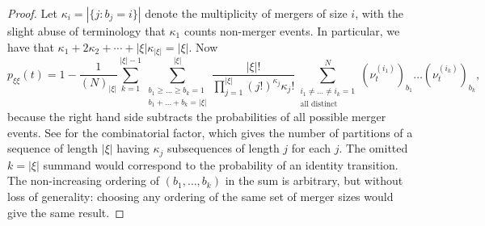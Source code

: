 \documentclass{article}
\theoremstyle{definition}
\newcommand{\1}[1]{\mathbbm{1}_{\{#1\}}}
\begin{document}
\begin{proof}
Let $\kappa_i = |\{ j : b_j = i \}|$ denote the multiplicity of mergers of size $i$, with the slight abuse of terminology that $\kappa_1$ counts non-merger events.
In particular, we have that $\kappa_1 + 2 \kappa_2 + \cdots + | \xi | \kappa_{ | \xi | } = | \xi |$.
Now
\begin{equation*}
p_{ \xi \xi }( t ) = 1 - \frac{ 1 }{ ( N )_{ | \xi | } } \sum_{ k = 1 }^{ | \xi | - 1 } \sum_{ \substack{ b_1 \geq \ldots \geq b_k = 1 \\ b_1 + \ldots + b_k = | \xi | } }^{ | \xi | } \frac{ | \xi |! }{ \prod_{ j = 1 }^{ | \xi | } ( j ! )^{ \kappa_j } \kappa_j ! } \sum_{ \substack{ i_1 \neq \ldots \neq i_k = 1 \\ \text{all distinct} } }^N( \nu_t^{ ( i_1 ) } )_{ b_1 } \ldots ( \nu_t^{ ( i_k ) } )_{ b_k },
\end{equation*}
because the right hand side subtracts the probabilities of all possible merger events.
See \citet[Eq (11)]{fu2006} for the combinatorial factor, which gives the number of partitions of a sequence of length $|\xi|$  having $\kappa_j$ subsequences of length $j$ for each $j$.
The omitted $k = | \xi |$ summand would correspond to the probability of an identity transition.
The non-increasing ordering of $( b_1, \ldots, b_k )$ in the sum is arbitrary, but without loss of generality: choosing any ordering of the same set of merger sizes would give the same result.


\end{proof}
\end{document}
